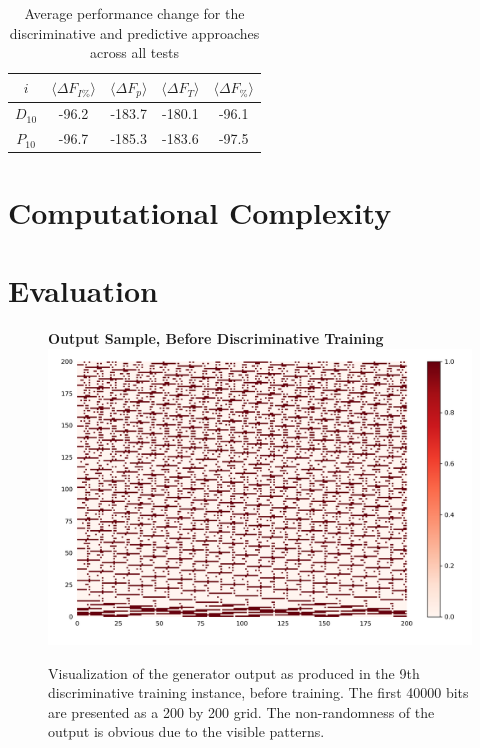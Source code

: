 \documentclass[12pt, titlepage]{report}
\theoremstyle{definition}
\begin{document}
\begin{table}
\begin{tabular}{cSSSS} \toprule
    {$i$}     & {$\langle \Delta F_{I\%} \rangle$}	& {$\langle \Delta F_p \rangle$} 	& {$\langle \Delta F_T \rangle$} 	& {$\langle \Delta F_{\%} \rangle$} \\ \midrule
    $D_{10}$ & -96.2 						& -183.7					& 	-180.1	  					& -96.1 \\ \midrule
    $P_{10}$ & -96.7  						& -185.3					& -183.6						& -97.5 \\ \bottomrule
\end{tabular}

\caption{Average performance change for the discriminative and predictive approaches across all tests}
\end{table}


\section{Computational Complexity}




\section{Evaluation}\label{subsection:evaluation}

\begin{figure}
\centering
\textbf{Output Sample, Before Discriminative Training}
\includegraphics[width=1\textwidth]{img/discriminative_before}\\
\caption{Visualization of the generator output as produced in the 9th discriminative training instance, before training. The first 40000 bits are presented as a 200 by 200 grid. The non-randomness of the output is obvious due to the visible patterns.}
\label{figure:visualize_discriminative_before}
\end{figure}
\end{document}
